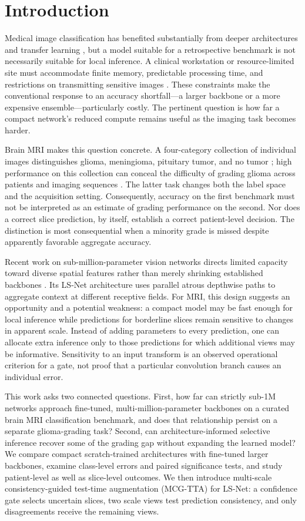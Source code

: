 \section{Introduction}
Medical image classification has benefited substantially from deeper architectures and transfer learning \cite{litjens2017,tajbakhsh2016}, but a model suitable for a retrospective benchmark is not necessarily suitable for local inference. A clinical workstation or resource-limited site must accommodate finite memory, predictable processing time, and restrictions on transmitting sensitive images \cite{kaissis2021}. These constraints make the conventional response to an accuracy shortfall---a larger backbone or a more expensive ensemble---particularly costly. The pertinent question is how far a compact network's reduced compute remains useful as the imaging task becomes harder.

Brain MRI makes this question concrete. A four-category collection of individual images distinguishes glioma, meningioma, pituitary tumor, and no tumor \cite{nickparvar}; high performance on this collection can conceal the difficulty of grading glioma across patients and imaging sequences \cite{menze2015}. The latter task changes both the label space and the acquisition setting. Consequently, accuracy on the first benchmark must not be interpreted as an estimate of grading performance on the second. Nor does a correct slice prediction, by itself, establish a correct patient-level decision. The distinction is most consequential when a minority grade is missed despite apparently favorable aggregate accuracy.

Recent work on sub-million-parameter vision networks directs limited capacity toward diverse spatial features rather than merely shrinking established backbones \cite{kyrkou2026}. Its LS-Net architecture uses parallel atrous depthwise paths to aggregate context at different receptive fields. For MRI, this design suggests an opportunity and a potential weakness: a compact model may be fast enough for local inference while predictions for borderline slices remain sensitive to changes in apparent scale. Instead of adding parameters to every prediction, one can allocate extra inference only to those predictions for which additional views may be informative. Sensitivity to an input transform is an observed operational criterion for a gate, not proof that a particular convolution branch causes an individual error.

This work asks two connected questions. First, how far can strictly sub-1M networks approach fine-tuned, multi-million-parameter backbones on a curated brain MRI classification benchmark, and does that relationship persist on a separate glioma-grading task? Second, can architecture-informed selective inference recover some of the grading gap without expanding the learned model? We compare compact scratch-trained architectures with fine-tuned larger backbones, examine class-level errors and paired significance tests, and study patient-level as well as slice-level outcomes. We then introduce multi-scale consistency-guided test-time augmentation (MCG-TTA) for LS-Net: a confidence gate selects uncertain slices, two scale views test prediction consistency, and only disagreements receive the remaining views.

